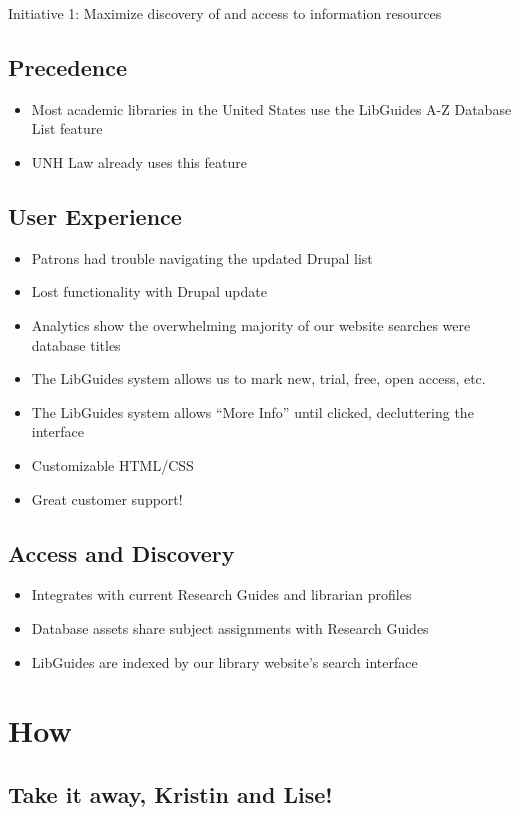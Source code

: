 \documentclass[11pt]{article}
\begin{document}
Initiative 1: Maximize discovery of and access to information resources

\subsection*{Precedence}
\label{sec:org609c3b6}
\begin{itemize}
\item Most academic libraries in the United States use the LibGuides A-Z Database List feature
\item UNH Law already uses this feature
\end{itemize}

\subsection*{User Experience}
\label{sec:org2a53085}
\begin{itemize}
\item Patrons had trouble navigating the updated Drupal list
\item Lost functionality with Drupal update
\item Analytics show the overwhelming majority of our website searches were database titles
\item The LibGuides system allows us to mark new, trial, free, open access, etc.
\item The LibGuides system allows ``More Info'' until clicked, decluttering the interface
\item Customizable HTML/CSS
\item Great customer support!
\end{itemize}

\subsection*{Access and Discovery}
\label{sec:orga8d0fc8}
\begin{itemize}
\item Integrates with current Research Guides and librarian profiles
\item Database assets share subject assignments with Research Guides
\item LibGuides are indexed by our library website's search interface
\end{itemize}

\section*{How}
\label{sec:orgcc2fadb}
\subsection*{Take it away, Kristin and Lise!}
\label{sec:orga2d8130}
\end{document}

